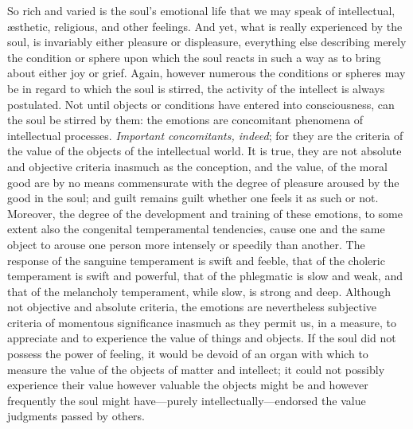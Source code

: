 So rich and varied is the soul’s emotional life that we may speak of intellectual, æsthetic, religious, and other feelings. And yet, what is really experienced by the soul, is invariably either pleasure or displeasure, everything else describing merely the condition or sphere upon which the soul reacts in such a way as to bring about either joy or
grief. Again, however numerous the conditions or spheres may be in regard to which the soul is stirred, the activity of the intellect is always postulated. Not until objects or conditions have entered into consciousness, can the soul be stirred by them: the emotions are concomitant phenomena of intellectual processes. \emph{Important concomitants, indeed}; for they are the criteria of the value of the objects of the intellectual world. It is true, they are not absolute and objective criteria inasmuch as the conception, and the value, of the moral good are by no means commensurate with the degree of pleasure aroused by the good in the soul; and guilt remains guilt whether one feels it as such or not. Moreover, the degree of the development and training of these emotions, to some extent also the congenital temperamental tendencies, cause one and the same object to arouse one person more intensely or speedily than another. The response of the sanguine temperament is swift and feeble, that of the choleric temperament is swift and powerful, that of the phlegmatic is slow and weak, and that of the melancholy temperament, while slow, is strong and deep. Although not objective and absolute criteria, the emotions are nevertheless subjective criteria of momentous significance inasmuch as they permit us, in a measure, to appreciate and to experience the value of things and objects. If the soul did not possess the power of feeling, it would be devoid of an organ with which to measure the value of the objects of matter and intellect; it could not possibly experience their value however valuable the objects might be and however frequently the soul might have—purely intellectually—endorsed the value judgments passed by others.

